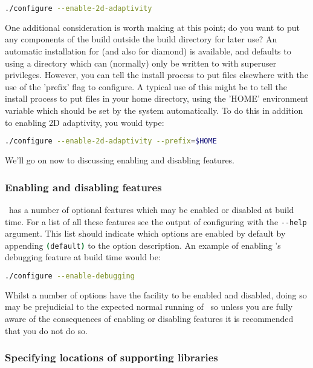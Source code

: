 \begin{lstlisting}[language=Bash]
./configure --enable-2d-adaptivity
\end{lstlisting}

One additional consideration is worth making at this point; do you want to put
any components of the \fluidity build outside the build directory for later
use?  An automatic installation for \fluidity (and also for diamond) is
available, and defaults to using a directory which can (normally) only be
written to with superuser privileges. However, you can tell the install process
to put files elsewhere with the use of the 'prefix' flag to configure. A
typical use of this might be to tell the install process to put files in your
home directory, using the 'HOME' environment variable which should be set by
the system automatically. To do this in addition to enabling 2D adaptivity, you
would type:

\begin{lstlisting}[language=Bash]
./configure --enable-2d-adaptivity --prefix=$HOME
\end{lstlisting}

We'll go on now to discussing enabling and disabling features.

\subsubsection{Enabling and disabling features}
\label{sec:configure_enable_disable_features}

\fluidity\ has a number of optional features which may be enabled or disabled at
build time. For a list of all these features see the output of configuring with
the \lstinline[language=Bash]+--help+ argument. This list should indicate which
options are enabled by default by appending
\lstinline[language=Bash]+(default)+ to the option description. An example of
enabling \fluidity's debugging feature at build time would be:

\begin{lstlisting}[language=Bash]
./configure --enable-debugging
\end{lstlisting}

Whilst a number of options have the facility to be enabled and disabled, doing
so may be prejudicial to the expected normal running of \fluidity\ so unless you
are fully aware of the consequences of enabling or disabling features it is
recommended that you do not do so.

\subsubsection{Specifying locations of supporting libraries}
\label{sec:configure_locate_supporting_libs}

